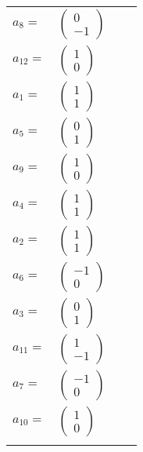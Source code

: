 \documentclass[1p]{elsarticle_modified}
\theoremstyle{definition}
\begin{document}
\begin{tabular}{m{7pt} m{180pt} m{7pt} m{180pt} }
\flushright $a_{8}=$&$\begin{pmatrix}0\\-1\end{pmatrix}$ \\
\flushright $a_{12}=$&$\begin{pmatrix}1\\0\end{pmatrix}$ \\
\flushright $a_{1}=$&$\begin{pmatrix}1\\1\end{pmatrix}$ \\
\flushright $a_{5}=$&$\begin{pmatrix}0\\1\end{pmatrix}$ \\
\flushright $a_{9}=$&$\begin{pmatrix}1\\0\end{pmatrix}$ \\
\flushright $a_{4}=$&$\begin{pmatrix}1\\1\end{pmatrix}$ \\
\flushright $a_{2}=$&$\begin{pmatrix}1\\1\end{pmatrix}$ \\
\flushright $a_{6}=$&$\begin{pmatrix}-1\\0\end{pmatrix}$ \\
\flushright $a_{3}=$&$\begin{pmatrix}0\\1\end{pmatrix}$ \\
\flushright $a_{11}=$&$\begin{pmatrix}1\\-1\end{pmatrix}$ \\
\flushright $a_{7}=$&$\begin{pmatrix}-1\\0\end{pmatrix}$ \\
\flushright $a_{10}=$&$\begin{pmatrix}1\\0\end{pmatrix}$\\&\end{tabular}
\end{document}

